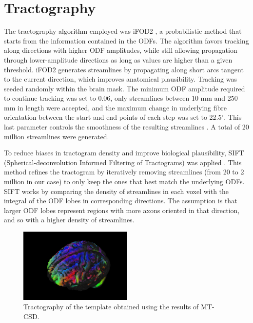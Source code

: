 \section{Tractography}
The tractography algorithm employed was iFOD2 \cite{Tournier2010}, a probabilistic method that starts from the information contained in the ODFs. The algorithm favors tracking along directions with higher ODF amplitudes, while still allowing propagation through lower-amplitude directions as long as values are higher than a given threshold. iFOD2 generates streamlines by propagating along short arcs tangent to the current direction, which improves anatomical plausibility. Tracking was seeded randomly within the brain mask. The minimum ODF amplitude required to continue tracking was set to 0.06, only streamlines between 10 mm and 250 mm in length were accepted, and the maximum change in underlying fibre orientation between the start and end points of each step was set to 22.5$^\circ$. This last parameter controls the smoothness of the resulting streamlines \cite{Smith2012}. A total of 20 million streamlines were generated.

To reduce biases in tractogram density and improve biological plausibility, SIFT (Spherical-deconvolution Informed Filtering of Tractograms) was applied \cite{Smith2013}. This method refines the tractogram by iteratively removing streamlines (from 20 to 2 million in our case) to only keep the ones that best match the underlying ODFs. SIFT works by comparing the density of streamlines in each voxel with the integral of the ODF lobes in corresponding directions. The assumption is that larger ODF lobes represent regions with more axons oriented in that direction, and so with a higher density of streamlines.

\begin{figure}[h]
  \centering
  \includegraphics[width=0.5\textwidth]{Images/tractography.png} %
  \caption{Tractography of the template obtained using the results of MT-CSD.}
  \label{fig:tractography}
\end{figure}

